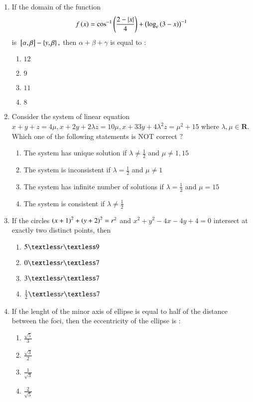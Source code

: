 \documentclass[journal,12pt,twocolumn]{IEEEtran}
\theoremstyle{remark}
\begin{document}
\begin{enumerate}
    \item If the domain of the function $$f\left(x\right)=\cos^{-1}\left(\frac{2-\left\vert x\right\vert}{4}\right)+\left(\log_e\left(3-x\right)\right)^{-1}$$ is ${}\left[\alpha,\beta\right]-\left\{y,\beta\right\},$ then $\alpha+\beta+\gamma$ is equal to $:$\\
    \begin{enumerate}
        \item $12$
        \item $9$
        \item $11$
        \item $8$
\end{enumerate}
\item Consider the system of linear equation $x+y+z=4\mu,x+2y+2\lambda z=10\mu,x+33y+4\lambda^2z=\mu^2+15$ where $\lambda,\mu\in \textbf{R}.$ Which one of the following statements is NOT correct $?$\\
\begin{enumerate}
    \item The system has unique solution if $\lambda \neq \frac{1}{2}$ and $\mu\neq 1,15$
    \item The system is inconsistent if $\lambda=\frac{1}{2}$ and $\mu\neq 1$
    \item The system has infinite number of solutions if $\lambda=\frac{1}{2}$ and $\mu=15$
    \item The system is consistent if $\lambda\neq\frac{1}{2}$
\end{enumerate}
\item If the circles $\left(x+1\right)^2+\left(y+2\right)^2=r^2$ and $x^2+y^2-4x-4y+4=0$ intersect at exactly two distinct points, then\\
\begin{enumerate}
    \item $5\textless r\textless 9$
    \item $0\textless r\textless 7$
    \item $3\textless r\textless 7$
    \item $\frac{1}{2}\textless r\textless 7$
\end{enumerate}
\item If the lenght of the minor axis of ellipse is equal to half of the distance between the foci, then the eccentricity of the ellipse is $:$\\
\begin{enumerate}
    \item $\frac{\sqrt{5}}{3}$
    \item $\frac{\sqrt{3}}{2}$
    \item $\frac{1}{\sqrt{3}}$
    \item $\frac{2}{\sqrt{5}}$
\end{enumerate}
\end{enumerate}
\end{document}
